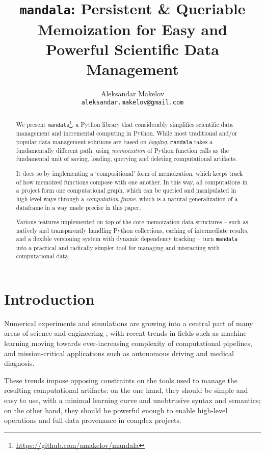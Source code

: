 \documentclass[11pt,twoside=semi,openright,numbers=noenddot]{scrartcl}
\title{\texttt{mandala}: Persistent \& Queriable Memoization for Easy and Powerful Scientific Data Management}
\author{Aleksandar Makelov\\ \texttt{aleksandar.makelov@gmail.com}}
\begin{document}
\maketitle


\begin{abstract}
  We present \texttt{mandala}\footnote{\url{https://github.com/amakelov/mandala}}, a Python library that considerably simplifies
  scientific data management and incremental computing in Python. While most
  traditional and/or popular data management solutions are based on \emph{logging},
  \texttt{mandala} takes a fundamentally different path, using
  \emph{memoization} of Python function calls as the fundamental unit of saving,
  loading, querying and deleting computational artifacts. 
  
  It does so by implementing a `compositional' form of memoization, which keeps
  track of how memoized functions compose with one another. In this way, all
  computations in a project form one computational graph, which can be queried
  and manipulated in high-level ways through a \emph{computation frame}, which
  is a natural generalization of a dataframe in a way made precise in this
  paper. 

  Various features implemented on top of the core memoization data structures --
  such as natively and transparently handling Python collections, caching of
  intermediate results, and a flexible versioning system with dynamic dependency
  tracking -- turn \texttt{mandala} into a practical and radically simpler tool
  for managing and interacting with computational data.
\end{abstract}

\section{Introduction}
\label{section:}

Numerical experiments and simulations are growing into a central part of many
areas of science and engineering \cite{hey2009fourth}, with recent trends in
fields such as machine learning moving towards ever-increasing complexity of
computational pipelines, and mission-critical applications such as autonomous
driving and medical diagnosis.

These trends impose opposing constraints on the tools used to manage the
resulting computational artifacts: on the one hand, they should be simple and
easy to use, with a minimal learning curve and unobtrusive syntax and semantics;
on the other hand, they should be powerful enough to enable high-level
operations and full data provenance in complex projects.
\end{document}
